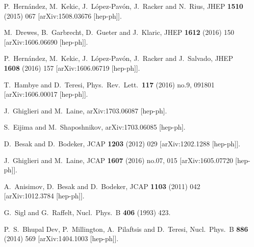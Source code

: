 \documentclass[prd,twocolumn,superscriptaddress,preprintnumbers,nofootinbib,
noshowpacs,groupedaddress]{revtex4-1} %
\begin{document}
\begin{thebibliography}{99}
  P.~Hern\'andez, M.~Kekic, J.~L\'opez-Pav\'on, J.~Racker and N.~Rius,
  JHEP {\bf 1510} (2015) 067
  [arXiv:1508.03676 [hep-ph]].
  
  M.~Drewes, B.~Garbrecht, D.~Gueter and J.~Klaric,
  JHEP {\bf 1612} (2016) 150
  [arXiv:1606.06690 [hep-ph]].

  P.~Hern\'andez, M.~Kekic, J.~L\'opez-Pav\'on, J.~Racker and J.~Salvado,
  JHEP {\bf 1608} (2016) 157
  [arXiv:1606.06719 [hep-ph]].



  T.~Hambye and D.~Teresi,
  Phys.\ Rev.\ Lett.\  {\bf 117} (2016) no.9,  091801
  [arXiv:1606.00017 [hep-ph]].

  J.~Ghiglieri and M.~Laine,
  arXiv:1703.06087 [hep-ph].
  
  S.~Eijima and M.~Shaposhnikov,
  arXiv:1703.06085 [hep-ph].

  D.~Besak and D.~Bodeker,
  JCAP {\bf 1203} (2012) 029
  [arXiv:1202.1288 [hep-ph]].
  
  J.~Ghiglieri and M.~Laine,
  JCAP {\bf 1607} (2016) no.07,  015
  [arXiv:1605.07720 [hep-ph]].

  A.~Anisimov, D.~Besak and D.~Bodeker,
  JCAP {\bf 1103} (2011) 042
  [arXiv:1012.3784 [hep-ph]].

  G.~Sigl and G.~Raffelt,
  Nucl.\ Phys.\ B {\bf 406} (1993) 423.

  P.~S.~Bhupal Dev, P.~Millington, A.~Pilaftsis and D.~Teresi,
  Nucl.\ Phys.\ B {\bf 886} (2014) 569
  [arXiv:1404.1003 [hep-ph]].
  

\end{thebibliography}
\end{document}
